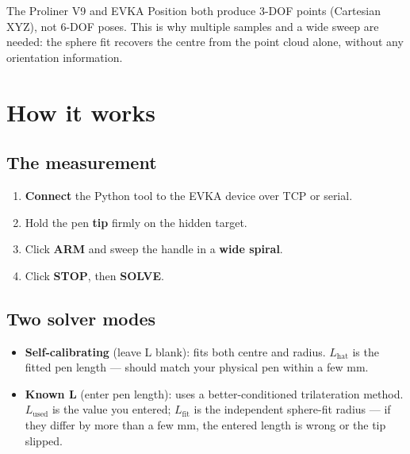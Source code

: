 \documentclass[11pt,a4paper]{article}
\begin{document}
The Proliner V9 and EVKA Position both produce 3-DOF points (Cartesian XYZ),
not 6-DOF poses.  This is why multiple samples and a wide sweep are needed: the
sphere fit recovers the centre from the point cloud alone, without any
orientation information.

\section{How it works}

\subsection{The measurement}

\begin{enumerate}
\item \textbf{Connect} the Python tool to the EVKA device over TCP or serial.
\item Hold the pen \textbf{tip} firmly on the hidden target.
\item Click \textbf{ARM} and sweep the handle in a \textbf{wide spiral}.
\item Click \textbf{STOP}, then \textbf{SOLVE}.
\end{enumerate}

\begin{center}
\end{center}

\subsection{Two solver modes}

\begin{itemize}
\item \textbf{Self-calibrating} (leave L blank): fits both centre and radius.
  $L_{\text{hat}}$ is the fitted pen length --- should match your physical pen
  within a few mm.
\item \textbf{Known L} (enter pen length): uses a better-conditioned trilateration
  method.  $L_{\text{used}}$ is the value you entered; $L_{\text{fit}}$ is the
  independent sphere-fit radius --- if they differ by more than a few mm, the
  entered length is wrong or the tip slipped.
\end{itemize}
\end{document}

